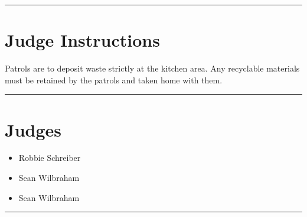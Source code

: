 \documentclass[10pt]{article}
\begin{document}
	\vspace{0.5cm}
	\hrule
	\vspace{0.5cm}

		\section*{Judge Instructions}
		Patrols are to deposit waste strictly at the kitchen area. Any recyclable materials must be retained by the patrols and taken home with them.


\vspace{0.5cm}
	\hrule
	\vspace{0.5cm}
		\section*{\faUsers \: Judges}

		

	\begin{multicols}{2}

		\begin{itemize}
									\item Robbie Schreiber
									\item Sean Wilbraham
						\end{itemize}

		\vfill\null
		\columnbreak

		\begin{itemize}
									\item Sean Wilbraham
						\end{itemize}

		\vfill\null

		\end{multicols}



			\vspace{0.5cm}
	\hrule
	\vspace{0.5cm}
\end{document}
